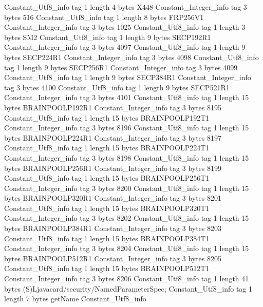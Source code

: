 {{{		}
		Constant_Utf8_info {
			tag	1
			length	4
			bytes	X448
		}
		Constant_Integer_info {
			tag	3
			bytes	516
		}
		Constant_Utf8_info {
			tag	1
			length	8
			bytes	FRP256V1
		}
		Constant_Integer_info {
			tag	3
			bytes	1025
		}
		Constant_Utf8_info {
			tag	1
			length	3
			bytes	SM2
		}
		Constant_Utf8_info {
			tag	1
			length	9
			bytes	SECP192R1
		}
		Constant_Integer_info {
			tag	3
			bytes	4097
		}
		Constant_Utf8_info {
			tag	1
			length	9
			bytes	SECP224R1
		}
		Constant_Integer_info {
			tag	3
			bytes	4098
		}
		Constant_Utf8_info {
			tag	1
			length	9
			bytes	SECP256R1
		}
		Constant_Integer_info {
			tag	3
			bytes	4099
		}
		Constant_Utf8_info {
			tag	1
			length	9
			bytes	SECP384R1
		}
		Constant_Integer_info {
			tag	3
			bytes	4100
		}
		Constant_Utf8_info {
			tag	1
			length	9
			bytes	SECP521R1
		}
		Constant_Integer_info {
			tag	3
			bytes	4101
		}
		Constant_Utf8_info {
			tag	1
			length	15
			bytes	BRAINPOOLP192R1
		}
		Constant_Integer_info {
			tag	3
			bytes	8195
		}
		Constant_Utf8_info {
			tag	1
			length	15
			bytes	BRAINPOOLP192T1
		}
		Constant_Integer_info {
			tag	3
			bytes	8196
		}
		Constant_Utf8_info {
			tag	1
			length	15
			bytes	BRAINPOOLP224R1
		}
		Constant_Integer_info {
			tag	3
			bytes	8197
		}
		Constant_Utf8_info {
			tag	1
			length	15
			bytes	BRAINPOOLP224T1
		}
		Constant_Integer_info {
			tag	3
			bytes	8198
		}
		Constant_Utf8_info {
			tag	1
			length	15
			bytes	BRAINPOOLP256R1
		}
		Constant_Integer_info {
			tag	3
			bytes	8199
		}
		Constant_Utf8_info {
			tag	1
			length	15
			bytes	BRAINPOOLP256T1
		}
		Constant_Integer_info {
			tag	3
			bytes	8200
		}
		Constant_Utf8_info {
			tag	1
			length	15
			bytes	BRAINPOOLP320R1
		}
		Constant_Integer_info {
			tag	3
			bytes	8201
		}
		Constant_Utf8_info {
			tag	1
			length	15
			bytes	BRAINPOOLP320T1
		}
		Constant_Integer_info {
			tag	3
			bytes	8202
		}
		Constant_Utf8_info {
			tag	1
			length	15
			bytes	BRAINPOOLP384R1
		}
		Constant_Integer_info {
			tag	3
			bytes	8203
		}
		Constant_Utf8_info {
			tag	1
			length	15
			bytes	BRAINPOOLP384T1
		}
		Constant_Integer_info {
			tag	3
			bytes	8204
		}
		Constant_Utf8_info {
			tag	1
			length	15
			bytes	BRAINPOOLP512R1
		}
		Constant_Integer_info {
			tag	3
			bytes	8205
		}
		Constant_Utf8_info {
			tag	1
			length	15
			bytes	BRAINPOOLP512T1
		}
		Constant_Integer_info {
			tag	3
			bytes	8206
		}
		Constant_Utf8_info {
			tag	1
			length	41
			bytes	(S)Ljavacard/security/NamedParameterSpec;
		}
		Constant_Utf8_info {
			tag	1
			length	7
			bytes	getName
		}
		Constant_Utf8_info {
}}}
